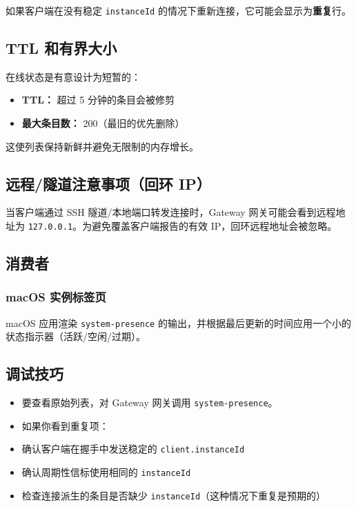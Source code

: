 如果客户端在没有稳定 \texttt{instanceId} 的情况下重新连接，它可能会显示为\textbf{重复}行。

\subsection{TTL 和有界大小}


在线状态是有意设计为短暂的：

\begin{itemize}
  \item \textbf{TTL：} 超过 5 分钟的条目会被修剪
  \item \textbf{最大条目数：} 200（最旧的优先删除）
\end{itemize}


这使列表保持新鲜并避免无限制的内存增长。

\subsection{远程/隧道注意事项（回环 IP）}


当客户端通过 SSH 隧道/本地端口转发连接时，Gateway 网关可能会看到远程地址为 \texttt{127.0.0.1}。为避免覆盖客户端报告的有效 IP，回环远程地址会被忽略。

\subsection{消费者}


\subsubsection{macOS 实例标签页}


macOS 应用渲染 \texttt{system-presence} 的输出，并根据最后更新的时间应用一个小的状态指示器（活跃/空闲/过期）。

\subsection{调试技巧}


\begin{itemize}
  \item 要查看原始列表，对 Gateway 网关调用 \texttt{system-presence}。
  \item 如果你看到重复项：
  \item 确认客户端在握手中发送稳定的 \texttt{client.instanceId}
  \item 确认周期性信标使用相同的 \texttt{instanceId}
  \item 检查连接派生的条目是否缺少 \texttt{instanceId}（这种情况下重复是预期的）
\end{itemize}



